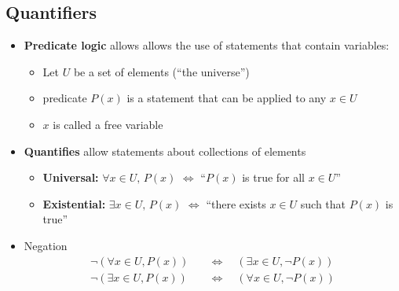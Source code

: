 \documentclass[11pt,twoside]{report}
\begin{document}
\subsection{Quantifiers} 

\begin{itemize}
\item \textbf{Predicate logic} %
 allows allows the use of statements that contain variables: 
\begin{itemize}
\item Let $U$ be a set of elements (``the  universe'') %
\item predicate $P(x)$ is a statement that can be applied to any $x \in U$
\item $x$ is called a free variable 
\end{itemize}


\item \textbf{Quantifies} allow statements about collections of elements
\begin{itemize}
\item \textbf{Universal:}  $\forall x \in U,\,  P(x)$  $\iff$  ``$P(x)$ is true for all $x \in U$'' 
\item \textbf{Existential:} $\exists x \in U,\,  P(x)$  $\iff$  ``there exists $x \in U$ such that  $P(x)$ is true'' 
\end{itemize}


\item Negation 
\begin{align*}
\neg ( \forall x \in U, P(x)) \quad & \iff  \quad ( \exists x \in U, \neg P(x)) \\
\neg ( \exists x \in U, P(x))  \quad & \iff  \quad ( \forall  x \in U, \neg P(x)) 
\end{align*}




\end{itemize}
\end{document}
